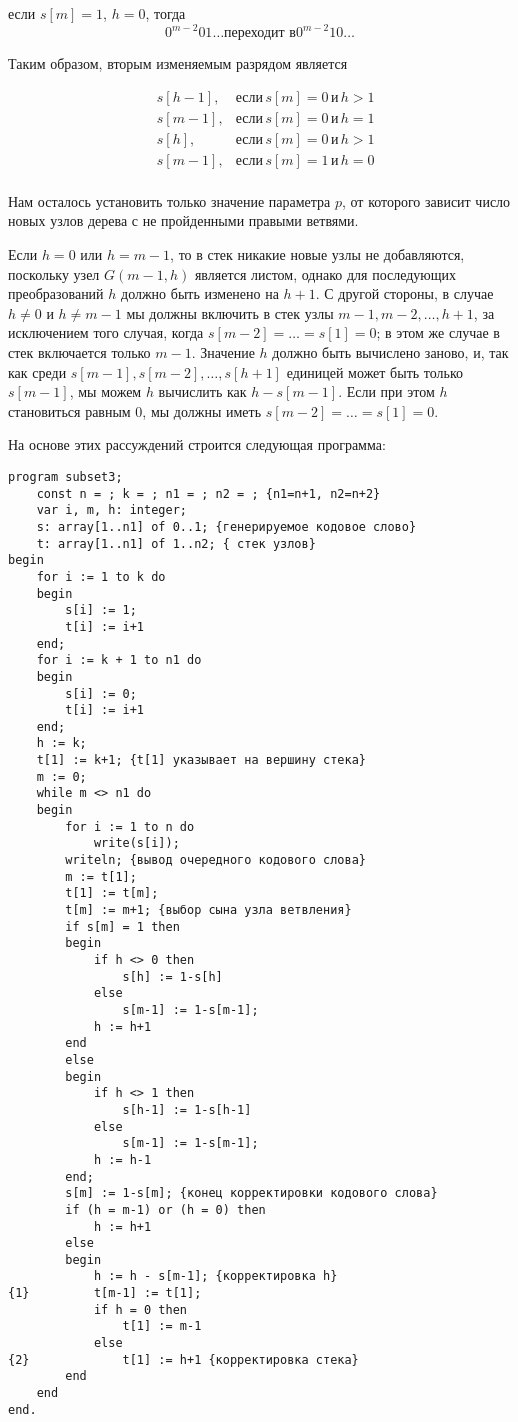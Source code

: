 \documentclass[12pt,a4paper]{article}
\theoremstyle{plain}
\theoremstyle{definition}
\theoremstyle{remark}
\begin{document}
если $s[m]=1$, $h=0$, тогда
\[ 0^{m-2}01\ldots \text{переходит в} 0^{m-2}10\ldots \]

Таким образом, вторым изменяемым разрядом является

\begin{align*}
&s[h-1], &\text{если}\,s[m]=0\,\text{и}\,h>1 \\
&s[m-1], &\text{если}\,s[m]=0\,\text{и}\,h=1 \\
&s[h], &\text{если}\,s[m]=0\,\text{и}\,h>1 \\ 
&s[m-1], &\text{если}\,s[m]=1\,\text{и}\,h=0 \\
\end{align*}

Нам осталось установить только значение параметра $p$, от которого зависит число новых узлов дерева с не пройденными правыми ветвями.

Если $h=0$ или $h=m-1$, то в стек никакие новые узлы не добавляются, поскольку узел $G(m-1,h)$ является листом, однако для последующих преобразований $h$ должно быть изменено на $h+1$. С другой стороны, в случае $h\ne0$ и $h\ne m-1$ мы должны включить в стек узлы $m-1, m-2,\ldots, h+1$, за исключением того случая, когда $s[m-2]=\ldots=s[1]=0$; в этом же случае в стек включается только $m-1$. Значение $h$ должно быть вычислено заново, и, так как среди $s[m-1], s[m-2],\ldots,s[h+1]$ единицей может быть только $s[m-1]$, мы можем $h$ вычислить как $h-s[m-1]$. Если при этом $h$ становиться равным 0, мы должны иметь $s[m-2]=\ldots=s[1]=0$.

На основе этих рассуждений строится следующая программа:

\begin{verbatim}
program subset3;
    const n = ; k = ; n1 = ; n2 = ; {n1=n+1, n2=n+2}
    var i, m, h: integer;
    s: array[1..n1] of 0..1; {генерируемое кодовое слово}
    t: array[1..n1] of 1..n2; { стек узлов}
begin
    for i := 1 to k do
    begin
        s[i] := 1;
        t[i] := i+1
    end;
    for i := k + 1 to n1 do
    begin
        s[i] := 0;
        t[i] := i+1
    end;
    h := k;
    t[1] := k+1; {t[1] указывает на вершину стека}
    m := 0;
    while m <> n1 do
    begin
        for i := 1 to n do
            write(s[i]);
        writeln; {вывод очередного кодового слова}
        m := t[1];
        t[1] := t[m];
        t[m] := m+1; {выбор сына узла ветвления}
        if s[m] = 1 then
        begin
            if h <> 0 then
                s[h] := 1-s[h]
            else
                s[m-1] := 1-s[m-1];
            h := h+1
        end
        else
        begin
            if h <> 1 then
                s[h-1] := 1-s[h-1]
            else
                s[m-1] := 1-s[m-1];
            h := h-1
        end;
        s[m] := 1-s[m]; {конец корректировки кодового слова}
        if (h = m-1) or (h = 0) then
            h := h+1
        else
        begin
            h := h - s[m-1]; {корректировка h}
{1}         t[m-1] := t[1];
            if h = 0 then
                t[1] := m-1
            else
{2}             t[1] := h+1 {корректировка стека}
        end
    end
end.
\end{verbatim}
\end{document}
